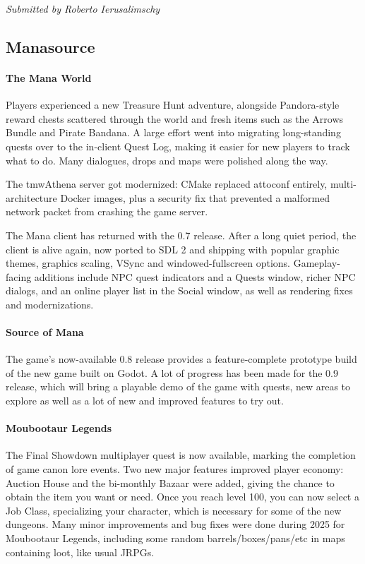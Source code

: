 \documentclass[a4paper]{report}
\begin{document}
{\em Submitted by Roberto Ierusalimschy}

\subsection{Manasource}

\paragraph{The Mana World}

Players experienced a new Treasure Hunt adventure, alongside Pandora-style reward chests scattered through the world and fresh items such as the Arrows Bundle and Pirate Bandana. A large effort went into migrating long-standing quests over to the in-client Quest Log, making it easier for new players to track what to do. Many dialogues, drops and maps were polished along the way.

The tmwAthena server got modernized: CMake replaced attoconf entirely, multi-architecture Docker images, plus a security fix that prevented a malformed network packet from crashing the game server.

The Mana client has returned with the 0.7 release. After a long quiet period, the client is alive again, now ported to SDL 2 and shipping with popular graphic themes, graphics scaling, VSync and windowed-fullscreen options. Gameplay-facing additions include NPC quest indicators and a Quests window, richer NPC dialogs, and an online player list in the Social window, as well as rendering fixes and modernizations.

\paragraph{Source of Mana}

The game's now-available 0.8 release provides a feature-complete prototype build of the new game built on Godot. A lot of progress has been made for the 0.9 release, which will bring a playable demo of the game with quests, new areas to explore as well as a lot of new and improved features to try out.

\paragraph{Moubootaur Legends}

The Final Showdown multiplayer quest is now available, marking the completion of game canon lore events. Two new major features improved player economy: Auction House and the bi-monthly Bazaar were added, giving the chance to obtain the item you want or need. Once you reach level 100, you can now select a Job Class, specializing your character, which is necessary for some of the new dungeons. Many minor improvements and bug fixes were done during 2025 for Moubootaur Legends, including some random barrels/boxes/pans/etc in maps containing loot, like usual JRPGs.
\end{document}
